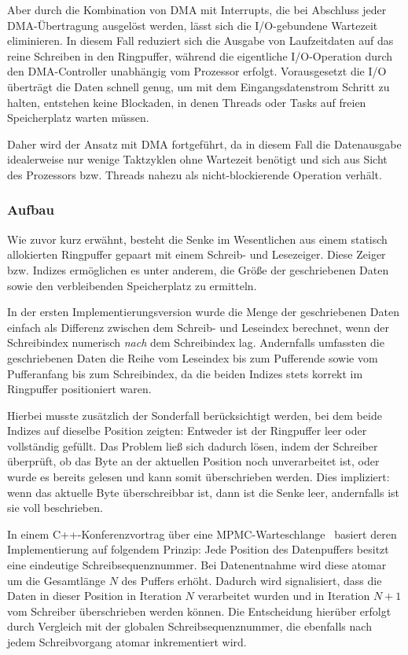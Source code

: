 Aber durch die Kombination von DMA mit Interrupts, die bei Abschluss jeder
DMA-Übertragung ausgelöst werden, lässt sich die I/O-gebundene Wartezeit
eliminieren. In diesem Fall reduziert sich die Ausgabe von Laufzeitdaten auf das
reine Schreiben in den Ringpuffer, während die eigentliche I/O-Operation durch
den DMA-Controller unabhängig vom Prozessor erfolgt. Vorausgesetzt die I/O
überträgt die Daten schnell genug, um mit dem Eingangsdatenstrom Schritt zu
halten, entstehen keine Blockaden, in denen Threads oder Tasks auf freien
Speicherplatz warten müssen.

Daher wird der Ansatz mit DMA fortgeführt, da in diesem Fall die Datenausgabe
idealerweise nur wenige Taktzyklen ohne Wartezeit benötigt und sich aus Sicht
des Prozessors bzw. Threads nahezu als nicht-blockierende Operation verhält.

\subsubsection{Aufbau}

Wie zuvor kurz erwähnt, besteht die Senke im Wesentlichen aus einem statisch
allokierten Ringpuffer gepaart mit einem Schreib- und Lesezeiger. Diese Zeiger
bzw. Indizes ermöglichen es unter anderem, die Größe der geschriebenen Daten
sowie den verbleibenden Speicherplatz zu ermitteln.

In der ersten Implementierungsversion wurde die Menge der geschriebenen Daten
einfach als Differenz zwischen dem Schreib- und Leseindex berechnet, wenn der
Schreibindex numerisch \textit{nach} dem Schreibindex lag. Andernfalls umfassten
die geschriebenen Daten die Reihe vom Leseindex bis zum Pufferende sowie vom
Pufferanfang bis zum Schreibindex, da die beiden Indizes stets korrekt im
Ringpuffer positioniert waren.

Hierbei musste zusätzlich der Sonderfall berücksichtigt werden, bei dem beide
Indizes auf dieselbe Position zeigten: Entweder ist der Ringpuffer leer oder
vollständig gefüllt. Das Problem ließ sich dadurch lösen, indem der Schreiber
überprüft, ob das Byte an der aktuellen Position noch unverarbeitet ist, oder
wurde es bereits gelesen und kann somit überschrieben werden. Dies impliziert:
wenn das aktuelle Byte überschreibbar ist, dann ist die Senke leer, andernfalls
ist sie voll beschrieben.

In einem C++-Konferenzvortrag über eine
\ac{MPMC}-Warteschlange~\cite{CppCon2024LockFreeQueue} basiert deren
Implementierung auf folgendem Prinzip: Jede Position des Datenpuffers besitzt
eine eindeutige Schreibsequenznummer. Bei Datenentnahme wird diese atomar um die
Gesamtlänge $N$ des Puffers erhöht. Dadurch wird signalisiert, dass die Daten in
dieser Position in Iteration $N$ verarbeitet wurden und in Iteration $N+1$ vom
Schreiber überschrieben werden können. Die Entscheidung hierüber erfolgt durch
Vergleich mit der globalen Schreibsequenznummer, die ebenfalls nach jedem
Schreibvorgang atomar inkrementiert wird.

